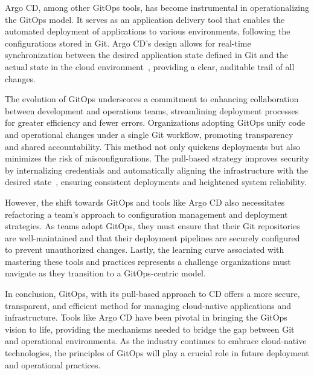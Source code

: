 Argo CD, among other GitOps tools, has become instrumental in operationalizing the GitOps model. It serves as an application delivery tool that enables the automated deployment of applications to various environments, following the configurations stored in Git. Argo CD's design allows for real-time synchronization between the desired application state defined in Git and the actual state in the cloud environment~\parencite{rollerArgoProjectMaking2022}, providing a clear, auditable trail of all changes. 

The evolution of GitOps underscores a commitment to enhancing collaboration between development and operations teams, streamlining deployment processes for greater efficiency and fewer errors. Organizations adopting GitOps unify code and operational changes under a single Git workflow, promoting transparency and shared accountability. This method not only quickens deployments but also minimizes the risk of misconfigurations. The pull-based strategy improves security by internalizing credentials and automatically aligning the infrastructure with the desired state~\parencite{beetzGitOpsEvolutionDevOps2022}, ensuring consistent deployments and heightened system reliability. 

However, the shift towards GitOps and tools like Argo CD also necessitates refactoring a team's approach to configuration management and deployment strategies. As teams adopt GitOps, they must ensure that their Git repositories are well-maintained and that their deployment pipelines are securely configured to prevent unauthorized changes. Lastly, the learning curve associated with mastering these tools and practices represents a challenge organizations must navigate as they transition to a GitOps-centric model. 

In conclusion, GitOps, with its pull-based approach to \ac{CD} offers a more secure, transparent, and efficient method for managing cloud-native applications and infrastructure. Tools like Argo CD have been pivotal in bringing the GitOps vision to life, providing the mechanisms needed to bridge the gap between Git and operational environments. As the industry continues to embrace cloud-native technologies, the principles of GitOps will play a crucial role in future deployment and operational practices. 

